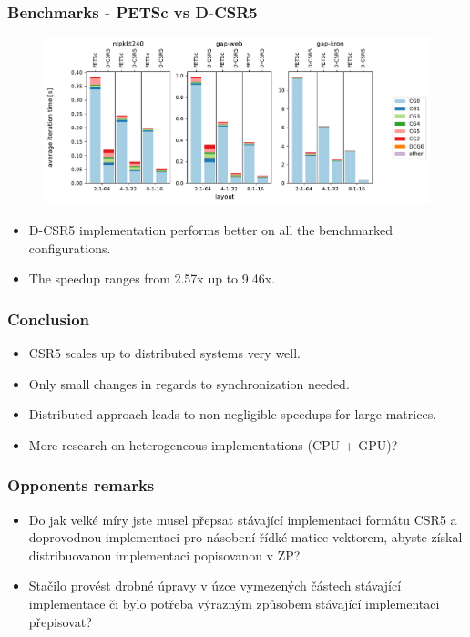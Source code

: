 \documentclass{beamer}
\begin{document}
\begin{frame}
    \frametitle{Benchmarks - PETSc vs D-CSR5}
    \begin{figure}[htp]
        \centering
        \includegraphics[scale=0.45]{static/petsc_vs_dim.pdf}
    \end{figure}
    \begin{itemize}
        \item D-CSR5 implementation performs better on all the benchmarked configurations.
        \item The speedup ranges from 2.57x up to 9.46x.
    \end{itemize}
\end{frame}

\begin{frame}
    \frametitle{Conclusion}
    \begin{itemize}
        \item CSR5 scales up to distributed systems very well.
        \item Only small changes in regards to synchronization needed.
        \item Distributed approach leads to non-negligible speedups for large matrices.
        \item More research on heterogeneous implementations (CPU + GPU)?
    \end{itemize}
\end{frame}

\begin{frame}
    \frametitle{Opponents remarks}
    \begin{overprint}
        \begin{itemize}
            \item Do jak velké míry jste musel přepsat stávající implementaci formátu CSR5 a doprovodnou implementaci pro násobení řídké matice vektorem, abyste získal distribuovanou implementaci popisovanou v ZP?
            \item Stačilo provést drobné úpravy v úzce vymezených částech stávající implementace či bylo potřeba výrazným způsobem stávající implementaci přepisovat?
        \end{itemize}
    \end{overprint}
\end{frame}
\end{document}
